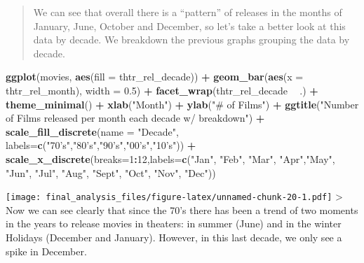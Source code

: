 \documentclass[]{article}
\newenvironment{Shaded}{\begin{snugshade}}{\end{snugshade}}
\newcommand{\DataTypeTok}[1]{\textcolor[rgb]{0.13,0.29,0.53}{#1}}
\newcommand{\DecValTok}[1]{\textcolor[rgb]{0.00,0.00,0.81}{#1}}
\newcommand{\FloatTok}[1]{\textcolor[rgb]{0.00,0.00,0.81}{#1}}
\newcommand{\KeywordTok}[1]{\textcolor[rgb]{0.13,0.29,0.53}{\textbf{#1}}}
\newcommand{\NormalTok}[1]{#1}
\newcommand{\OperatorTok}[1]{\textcolor[rgb]{0.81,0.36,0.00}{\textbf{#1}}}
\newcommand{\StringTok}[1]{\textcolor[rgb]{0.31,0.60,0.02}{#1}}
\begin{document}
\begin{quote}
We can see that overall there is a ``pattern'' of releases in the months
of January, June, October and December, so let's take a better look at
this data by decade. We breakdown the previous graphs grouping the data
by decade.
\end{quote}

\begin{Shaded}
\begin{Highlighting}[]
\KeywordTok{ggplot}\NormalTok{(movies, }\KeywordTok{aes}\NormalTok{(}\DataTypeTok{fill =}\NormalTok{ thtr_rel_decade)) }\OperatorTok{+}\StringTok{ }\KeywordTok{geom_bar}\NormalTok{(}\KeywordTok{aes}\NormalTok{(}\DataTypeTok{x =}\NormalTok{ thtr_rel_month), }\DataTypeTok{width =} \FloatTok{0.5}\NormalTok{) }\OperatorTok{+}\StringTok{ }\KeywordTok{facet_wrap}\NormalTok{(thtr_rel_decade }\OperatorTok{~}\StringTok{ }\NormalTok{.) }\OperatorTok{+}\StringTok{ }\KeywordTok{theme_minimal}\NormalTok{() }\OperatorTok{+}\StringTok{ }\KeywordTok{xlab}\NormalTok{(}\StringTok{"Month"}\NormalTok{) }\OperatorTok{+}\StringTok{ }\KeywordTok{ylab}\NormalTok{(}\StringTok{"# of Films"}\NormalTok{) }\OperatorTok{+}\StringTok{ }\KeywordTok{ggtitle}\NormalTok{(}\StringTok{"Number of Films released per month each decade w/ breakdown"}\NormalTok{) }\OperatorTok{+}\StringTok{ }\KeywordTok{scale_fill_discrete}\NormalTok{(}\DataTypeTok{name =} \StringTok{"Decade"}\NormalTok{, }\DataTypeTok{labels=}\KeywordTok{c}\NormalTok{(}\StringTok{"70's"}\NormalTok{,}\StringTok{"80's"}\NormalTok{,}\StringTok{"90's"}\NormalTok{,}\StringTok{"00's"}\NormalTok{,}\StringTok{"10's"}\NormalTok{)) }\OperatorTok{+}\StringTok{ }\KeywordTok{scale_x_discrete}\NormalTok{(}\DataTypeTok{breaks=}\DecValTok{1}\OperatorTok{:}\DecValTok{12}\NormalTok{,}\DataTypeTok{labels=}\KeywordTok{c}\NormalTok{(}\StringTok{"Jan"}\NormalTok{, }\StringTok{"Feb"}\NormalTok{, }\StringTok{"Mar"}\NormalTok{, }\StringTok{"Apr"}\NormalTok{,}\StringTok{"May"}\NormalTok{, }\StringTok{"Jun"}\NormalTok{, }\StringTok{"Jul"}\NormalTok{, }\StringTok{"Aug"}\NormalTok{, }\StringTok{"Sept"}\NormalTok{, }\StringTok{"Oct"}\NormalTok{, }\StringTok{"Nov"}\NormalTok{, }\StringTok{"Dec"}\NormalTok{))}
\end{Highlighting}
\end{Shaded}

\texttt{[image: final\_analysis\_files/figure-latex/unnamed-chunk-20-1.pdf]}
\textgreater{} Now we can see clearly that since the 70's there has been
a trend of two moments in the years to release movies in theaters: in
summer (June) and in the winter Holidays (December and January).
However, in this last decade, we only see a spike in December.
\end{document}
